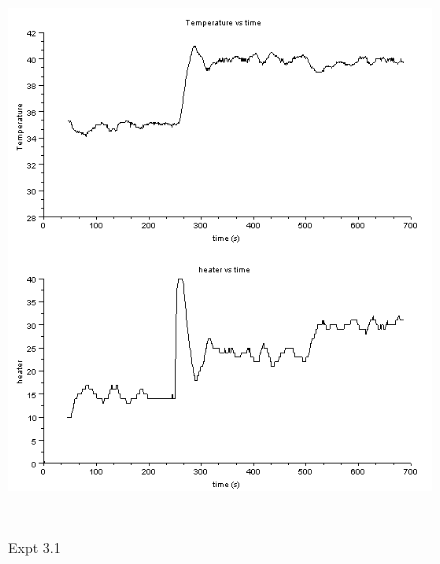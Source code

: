 \begin{figure}[H]
  \includegraphics[width=12cm, height=15cm]{mpc/3_1_heater_final.png}
  \caption{Expt 3.1}
\end{figure}


